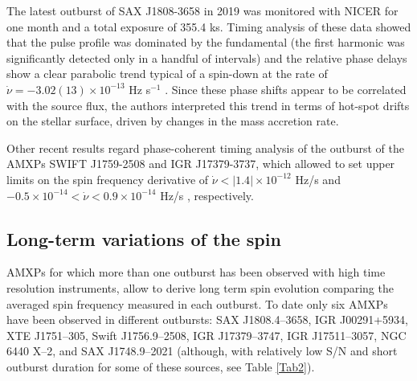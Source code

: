\documentclass[graybox]{svmult}
\begin{document}
The latest outburst of SAX J1808-3658 in 2019 was monitored with NICER for one month and a total exposure of 355.4 ks. Timing analysis of these data showed that the pulse profile was dominated by the fundamental (the first harmonic was significantly detected only in a handful of intervals) and the relative phase delays show a clear parabolic trend typical of a spin-down at the rate of $\dot{\nu} = -3.02(13)\times 10^{-13}$ Hz s$^{-1}$ \cite{Bult2019c}. Since these phase shifts appear to be correlated with the source flux, the authors interpreted this trend in terms of hot-spot drifts on the stellar surface, driven by changes in the mass accretion rate.    

Other recent results regard phase-coherent timing analysis of the outburst of the AMXPs SWIFT J1759-2508 and IGR J17379-3737, which allowed to set upper limits on the spin frequency derivative of $\dot{\nu}<|1.4|\times 10^{-12}$ Hz/s \cite{Sanna2019,Bult2018b} and $-0.5\times 10^{-14}<\dot{\nu}<0.9\times 10^{-14}$ Hz/s \cite{Bult2019c}, respectively.



\subsection{Long-term variations of the spin}
AMXPs for which more than one outburst has been observed with high time resolution instruments, allow to derive long term spin evolution comparing the averaged spin frequency measured in each outburst. To date only six AMXPs have been observed in different outbursts: SAX J1808.4--3658, IGR J00291+5934, XTE J1751--305, Swift J1756.9--2508, IGR J17379--3747, IGR J17511--3057, NGC 6440 X--2, and SAX J1748.9--2021 (although, with relatively low S/N and short outburst duration for some of these sources, see Table \ref{Tab2}). 
\end{document}
